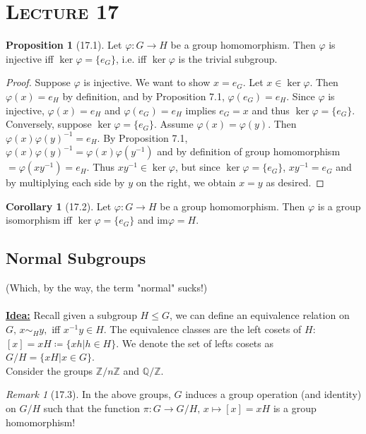 \documentclass{article}
\newcommand{\Z}{\mathbb{Z}}
\newcommand{\Q}{\mathbb{Q}}
\newcommand{\coleq}{\coloneqq}
\newcommand{\inverse}[1]{#1^{-1}}
\newcommand{\define}[1]{\textbf{\underline{#1}}}
\newcommand{\func}[3]{#1: #2 \to #3}
\theoremstyle{definition}
\newtheorem*{cor}{Corollary}
\newtheorem*{prop}{Proposition}
\theoremstyle{remark}
\newtheorem*{rmk}{Remark}
\newcommand{\im}[1]{\mathrm{im}#1}
\begin{document}
    \noindent\section*{\textbf{\textsc{Lecture 17}}}{
        \begin{prop}[17.1]
            Let $\func{\varphi}{G}{H}$ be a group homomorphism. Then $\varphi$ is injective iff $\ker\varphi=\{e_G\}$, i.e. iff $\ker\varphi$ is the trivial subgroup.
        \end{prop}
            \begin{proof}
                Suppose $\varphi$ is injective. We want to show $x=e_G$. Let $x\in \ker \varphi$. Then $\varphi(x)=e_H$ by definition, and by Proposition 7.1, $\varphi(e_G)=e_H$. Since $\varphi$ is injective, $\varphi(x)=e_H$ and $\varphi(e_G)=e_H$ implies $e_G=x$ and thus $\ker\varphi=\{e_G\}$.\\
                Conversely, suppose $\ker\varphi=\{e_G\}$. Assume $\varphi(x)=\varphi(y)$. Then $\varphi(x)\inverse{\varphi(y)}=e_H$. By Proposition 7.1, \\$\varphi(x)\inverse{\varphi(y)}=\varphi(x)\varphi(\inverse{y})$ and by definition of group homomorphism $=\varphi(x\inverse{y})=e_H$. Thus $x\inverse{y} \in \ker\varphi$, but since $\ker\varphi=\{e_G\}$, $x\inverse{y}=e_G$ and by multiplying each side by $y$ on the right, we obtain $x=y$ as desired.
            \end{proof}
            
        \begin{cor}[17.2]
            Let $\func{\varphi}{G}{H}$ be a group homomorphism. Then $\varphi$ is a group isomorphism iff $\ker\varphi=\{e_G\}$ and $\im\varphi=H$.
        \end{cor}
        \subsection*{Normal Subgroups}{
            (Which, by the way, the term "normal" sucks!)\\\\
            \define{Idea:} Recall given a subgroup $H\leq G$, we can define an equivalence relation on $G, \, x\sim_H y,$ iff $\inverse{x}y \in H$. The equivalence classes are the left cosets of $H$: $[x]=xH\coleq\{xh|h \in H\}$. We denote the set of lefts cosets as $G/H=\{xH|x \in G\}$.\\
            Consider the groups $\Z/n\Z$ and $\Q/\Z$.
            
            \begin{rmk}[17.3]
                In the above groups, $G$ induces a group operation (and identity) on $G/H$ such that the function $\func{\pi}{G}{G/H}, \, x\mapsto [x]=xH$ is a group homomorphism!
            \end{rmk}
            
}}
\end{document}
